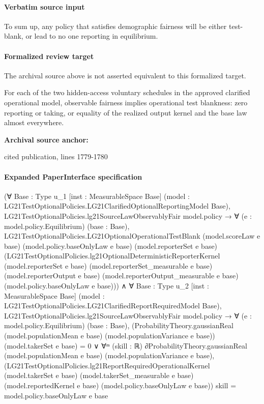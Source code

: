 \documentclass[10pt]{article}
\begin{document}
\paragraph{Verbatim source input}
\begin{ReviewVerbatim}
To sum up, any policy that satisﬁes demographic fairness will be either test-blank, or lead to no
one reporting in equilibrium.
\end{ReviewVerbatim}


\paragraph{Formalized review target}
The archival source above is not asserted equivalent to this formalized target.
\begin{ReviewVerbatim}
For each of the two hidden-access voluntary schedules in the approved clarified operational model, observable fairness implies operational test blankness: zero reporting or taking, or equality of the realized output kernel and the base law almost everywhere.
\end{ReviewVerbatim}

\textbf{Archival source anchor:} {\footnotesize\raggedright cited publication, lines 1779-\allowbreak{}1780\par}
\paragraph{Expanded PaperInterface specification}
\begin{ReviewVerbatim}
(∀ {Base : Type u_1} [inst : MeasurableSpace Base]
    (model : LG21TestOptionalPolicies.LG21ClarifiedOptionalReportingModel Base),
    LG21TestOptionalPolicies.lg21SourceLawObservablyFair model.policy →
      ∀ (e : model.policy.Equilibrium) (base : Base),
        LG21TestOptionalPolicies.LG21OptionalOperationalTestBlank (model.scoreLaw e base)
          (model.policy.baseOnlyLaw e base) (model.reporterSet e base)
          (LG21TestOptionalPolicies.lg21OptionalDeterministicReporterKernel (model.reporterSet e base)
            (model.reporterSet_measurable e base) (model.reporterOutput e base) (model.reporterOutput_measurable e base)
            (model.policy.baseOnlyLaw e base))) ∧
  ∀ {Base : Type u_2} [inst : MeasurableSpace Base]
    (model : LG21TestOptionalPolicies.LG21ClarifiedReportRequiredModel Base),
    LG21TestOptionalPolicies.lg21SourceLawObservablyFair model.policy →
      ∀ (e : model.policy.Equilibrium) (base : Base),
        (ProbabilityTheory.gaussianReal (model.populationMean e base) (model.populationVariance e base))
              (model.takerSet e base) =
            0 ∨
          ∀ᵐ (skill :
            ℝ) ∂ProbabilityTheory.gaussianReal (model.populationMean e base) (model.populationVariance e base),
            (LG21TestOptionalPolicies.lg21ReportRequiredOperationalKernel (model.takerSet e base)
                  (model.takerSet_measurable e base) (model.reportedKernel e base) (model.policy.baseOnlyLaw e base))
                skill =
              model.policy.baseOnlyLaw e base
\end{ReviewVerbatim}
\end{document}
